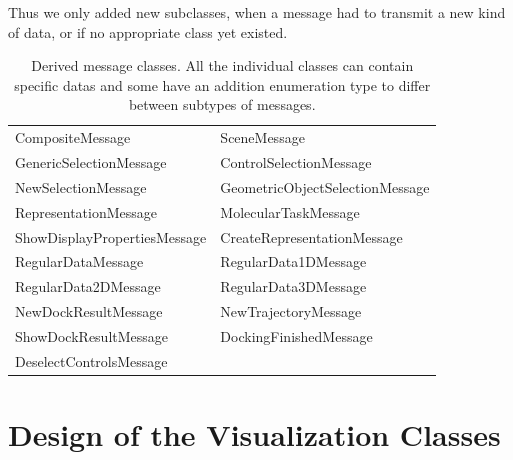 Thus we only added new  subclasses, when a message had to transmit a new kind 
of data, or if no appropriate class yet existed.
\begin{table} [ht] %
\centering
\begin{tabular} {|l|l|}
\hline
CompositeMessage             & SceneMessage\\
GenericSelectionMessage      & ControlSelectionMessage\\
NewSelectionMessage          & GeometricObjectSelectionMessage\\
RepresentationMessage        & MolecularTaskMessage\\
ShowDisplayPropertiesMessage & CreateRepresentationMessage\\
RegularDataMessage           & RegularData1DMessage \\
RegularData2DMessage         & RegularData3DMessage\\
NewDockResultMessage         & NewTrajectoryMessage\\
ShowDockResultMessage        & DockingFinishedMessage\\
DeselectControlsMessage      & \\
\hline
\end{tabular}
\caption{Derived message classes. 
All the individual classes can contain specific datas and some have an addition enumeration 
type to differ between subtypes of messages.}
\label{tab:messages}
\end{table}


\section{Design of the Visualization Classes}
